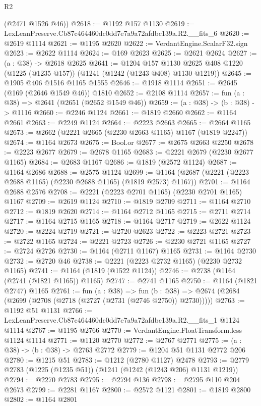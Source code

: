 \begin{lexlean}{R2}
\begin{coremodule}
      (@2471 @1526 @46))
@2618 := @1192 @157 @1130
@2619 := LexLeanPreserve.Cb87c464460dc0dd7e7a9a72afdbc139a.R2.__fits_6
@2620 := @2619 @1114
@2621 := @1195 @2620
@2622 := VerdantEngine.ScalarF32.sign
@2623 := @2622 @1114
@2624 := @169 @2623
@2625 := @2621 @2624
@2627 := (a : @38) -> @2618 @2625
@2641 := @1204
    @157
    @1130
    @2625
    @408
    @1220
    (@1225 (@1235 @157))
    (@1241 (@1242 (@1243 @408) @1130 @1219))
@2645 := @1905 @406 @1516 @1165 @1555
@2646 := @1918 @1114
@2651 := @2645 (@169 (@2646 @1549 @46)) @1810
@2652 := @2108 @1114
@2657 := fun (a : @38) => @2641 (@2651 (@2652 @1549 @46))
@2659 := (a : @38) -> (b : @38) -> @1116
@2660 := @2246 @1124
@2661 := @1819 @2660
@2662 := @1164 @2661
@2663 := @2249 @1124
@2664 := @2223 @2663
@2665 := @2664 @1165
@2673 := @2662 (@2221 @2665 (@2230 @2663 @1165) @1167 (@1819 @2247))
@2674 := @1164 @2673
@2675 := Bool.or
@2677 := @2675 @2663 @2250
@2678 := @2223 @2677
@2679 := @2678 @1165
@2683 := @2221 @2679 (@2230 @2677 @1165)
@2684 := @2683 @1167
@2686 := @1819 (@2572 @1124)
@2687 := @1164 @2686
@2688 := @2575 @1124
@2699 := @1164 (@2687 (@2221 (@2223 @2688 @1165) (@2230 @2688 @1165) (@1819 @2573) @1167))
@2701 := @1164 @2688 @2576
@2708 := @2221 (@2223 @2701 @1165) (@2230 @2701 @1165) @1167
@2709 := @2619 @1124
@2710 := @1819 @2709
@2711 := @1164 @2710
@2712 := @1819 @2620
@2714 := @1164 @2712 @1165
@2715 := @2711 @2714
@2717 := @1164 @2715 @1165
@2718 := @1164 @2717
@2719 := @2622 @1124
@2720 := @2224 @2719
@2721 := @2720 @2623
@2722 := @2223 @2721
@2723 := @2722 @1165
@2724 := @2221 @2723
@2726 := @2230 @2721 @1165
@2727 := @2724 @2726
@2730 := @1164 (@2711 @1167) @1165
@2731 := @1164 @2730
@2732 := @2720 @46
@2738 := @2221 (@2223 @2732 @1165) (@2230 @2732 @1165)
@2741 := @1164 (@1819 (@1522 @1124))
@2746 := @2738 (@1164 (@2741 (@1821 @1165)) @1165)
@2747 := @2741 @1165
@2750 := @1164 (@1821 @2747) @1165
@2761 := fun (a : @38) =>
  fun (b : @38) => @2674 (@2684 (@2699 (@2708 (@2718 (@2727 (@2731 (@2746 @2750)) @2730)))))
@2763 := @1192 @51 @1131
@2766 := LexLeanPreserve.Cb87c464460dc0dd7e7a9a72afdbc139a.R2.__fits_1 @1124 @1114
@2767 := @1195 @2766
@2770 := VerdantEngine.FloatTransform.less @1124 @1114
@2771 := @1120 @2770
@2772 := @2767 @2771
@2775 := (a : @38) -> (b : @38) -> @2763 @2772
@2779 := @1204 @51 @1131 @2772 @206
@2780 := @1215 @51
@2783 := @1212 (@2780 @1127) @2478
@2793 := @2779 @2783 (@1225 (@1235 @51)) (@1241 (@1242 (@1243 @206) @1131 @1219))
@2794 := @2270 @2783
@2795 := @2794 @136
@2798 := @2795 @110 @204 @2673
@2799 := @2281 @1167
@2800 := @2572 @1121
@2801 := @1819 @2800
@2802 := @1164 @2801

\end{coremodule}
\end{lexlean}
